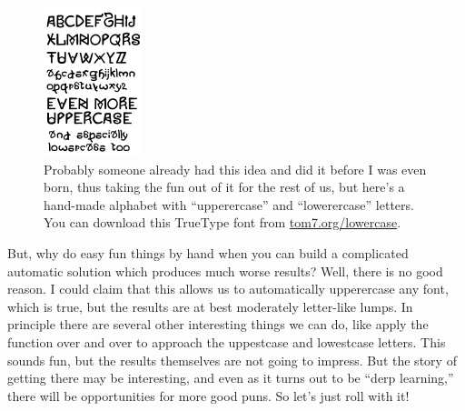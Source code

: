 \documentclass[twocolumn]{article}
\begin{document}
\begin{figure}[hb]
\centering
\includegraphics[width=0.9 \linewidth]{extracase}
\caption{%
  Probably someone already had this idea and did it before I was
  even born, thus taking the fun out of it for the rest of us, but
  here's a hand-made alphabet with ``upperercase'' and ``lowerercase''
  letters. You can download this TrueType font from \url{tom7.org/lowercase}.
} \label{fig:manual}
\end{figure}

But, why do easy fun things by hand when you can build a complicated
automatic solution which produces much worse results? Well, there is
no good reason. I could claim that this allows us to automatically
upperercase any font, which is true, but the results are at best
moderately letter-like lumps. In principle there are several other
interesting things we can do, like apply the function over and over to
approach the uppestcase and lowestcase letters. This sounds fun, but
the results themselves are not going to impress. But the story of
getting there may be interesting, and even as it turns out to be
``derp learning,'' there will be opportunities for more good puns. So
let's just roll with it!
\end{document}
